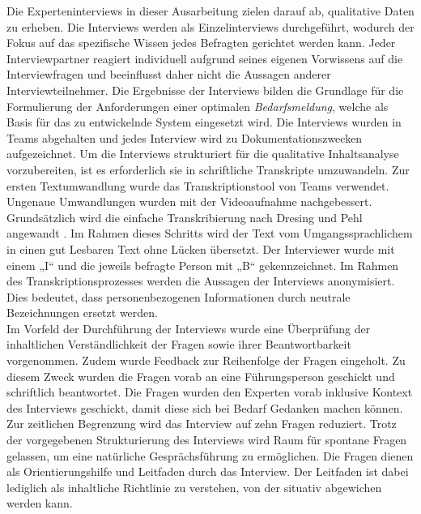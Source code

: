 Die Experteninterviews in dieser Ausarbeitung zielen darauf ab, qualitative Daten zu erheben. Die Interviews werden als Einzelinterviews durchgeführt, wodurch der Fokus auf das spezifische Wissen jedes Befragten gerichtet werden kann. Jeder Interviewpartner reagiert individuell aufgrund seines eigenen Vorwissens auf die Interviewfragen und beeinflusst daher nicht die Aussagen anderer Interviewteilnehmer. Die Ergebnisse der Interviews bilden die Grundlage für die Formulierung der Anforderungen einer optimalen \emph{Bedarfsmeldung}, welche als Basis für das zu entwickelnde System eingesetzt wird. Die Interviews wurden in Teams abgehalten und jedes Interview wird zu Dokumentationszwecken aufgezeichnet. Um die Interviews strukturiert für die qualitative Inhaltsanalyse vorzubereiten, ist es erforderlich sie in schriftliche Transkripte umzuwandeln. Zur ersten Textumwandlung wurde das Transkriptionstool von Teams verwendet. Ungenaue Umwandlungen wurden mit der Videoaufnahme nachgebessert. Grundsätzlich wird die einfache Transkribierung nach Dresing und Pehl angewandt \cite{dresing2015praxisbuch}. Im Rahmen dieses Schritts wird der Text vom Umgangssprachlichem in einen gut Lesbaren Text ohne Lücken übersetzt. Der Interviewer wurde mit einem „I“ und die jeweils befragte Person mit „B“ gekennzeichnet. Im Rahmen des Transkriptionsprozesses werden die Aussagen der Interviews anonymisiert. Dies bedeutet, dass personenbezogenen Informationen durch neutrale Bezeichnungen ersetzt werden.\\

Im Vorfeld der Durchführung der Interviews wurde eine Überprüfung der inhaltlichen Verständlichkeit der Fragen sowie ihrer Beantwortbarkeit vorgenommen. Zudem wurde Feedback zur Reihenfolge der Fragen eingeholt. Zu diesem Zweck wurden die Fragen vorab an eine Führungsperson geschickt und schriftlich beantwortet. Die Fragen wurden den Experten vorab inklusive Kontext des Interviews geschickt, damit diese sich bei Bedarf Gedanken machen können. Zur zeitlichen Begrenzung wird das Interview auf zehn Fragen reduziert. Trotz der vorgegebenen Strukturierung des Interviews wird Raum für spontane Fragen gelassen, um eine natürliche Gesprächsführung zu ermöglichen. Die Fragen dienen als Orientierungshilfe und Leitfaden durch das Interview. Der Leitfaden ist dabei lediglich als inhaltliche Richtlinie zu verstehen, von der situativ abgewichen werden kann.
